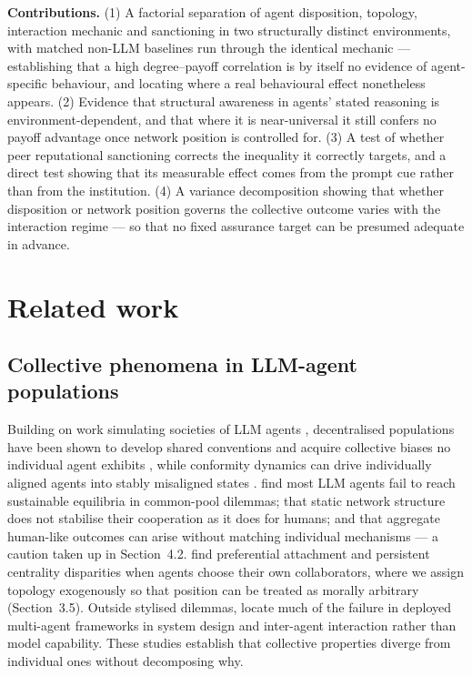 \documentclass[11pt,a4paper]{article}
\begin{document}
\textbf{Contributions.} (1) A factorial separation of agent
disposition, topology, interaction mechanic and sanctioning in two
structurally distinct environments, with matched non-LLM baselines run
through the identical mechanic --- establishing that a high
degree--payoff correlation is by itself no evidence of agent-specific
behaviour, and locating where a real behavioural effect nonetheless
appears. (2) Evidence that structural awareness in agents' stated
reasoning is environment-dependent, and that where it is near-universal
it still confers no payoff advantage once network position is
controlled for. (3) A test of whether peer reputational sanctioning
corrects the inequality it correctly targets, and a direct test
showing that its measurable effect comes from the prompt cue rather
than from the institution. (4) A variance decomposition showing that
whether disposition or network position governs the collective outcome
varies with the interaction regime --- so that no fixed
assurance target can be presumed adequate in advance.

\section{Related work}

\subsection{Collective phenomena in LLM-agent populations}

Building on work simulating societies of LLM agents
\citep{Park:2023:Generative,Li:2023:CAMEL}, decentralised populations have been
shown to develop shared conventions and acquire collective biases no
individual agent exhibits \citep{Ashery:2025:Conventions}, while conformity
dynamics can drive individually aligned agents into stably misaligned
states \citep{DeMarzo:2026:Conformity}. \citet{Piatti:2024:Cooperate} find
most LLM agents fail to reach sustainable equilibria in common-pool
dilemmas; \citet{Han:2025:Static} that static network structure does not
stabilise their cooperation as it does for humans; and
\citet{deArruda:2026:Cooperation} that aggregate human-like outcomes
can arise without matching individual mechanisms --- a caution taken
up in Section~4.2. \citet{Zhang:2026:Preferential} find
preferential attachment and persistent centrality disparities when
agents choose their own collaborators, where we assign topology
exogenously so that position can be treated as morally arbitrary
(Section~3.5). Outside stylised dilemmas, \citet{Cemri:2025:Failures} locate
much of the failure in deployed multi-agent frameworks in system
design and inter-agent interaction rather than model capability. These
studies establish that collective properties diverge from individual
ones without decomposing why.
\end{document}
